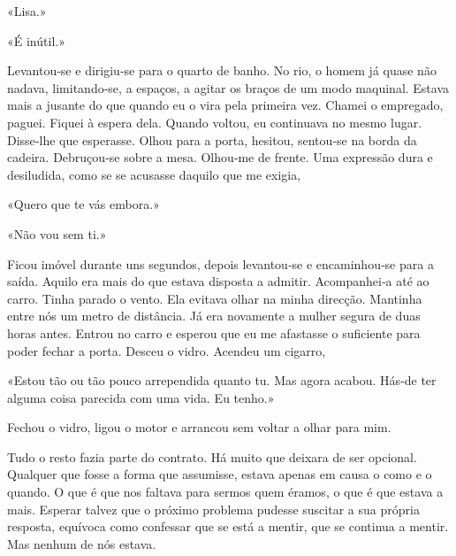 «Lisa.»

«É inútil.»

Levantou­‑se e dirigiu­‑se para o quarto de banho. No rio, o homem já
quase não nadava, limitando­‑se, a espaços, a agitar os braços de um
modo maquinal. Estava mais a jusante do que quando eu o vira pela
primeira vez. Chamei o empregado, paguei. Fiquei à espera dela. Quando
voltou, eu continuava no mesmo lugar. Disse­‑lhe que esperasse. Olhou
para a porta, hesitou, sentou­‑se na borda da cadeira. Debruçou­‑se
sobre a mesa. Olhou­‑me de frente. Uma expressão dura e desiludida, como
se se acusasse daquilo que me exigia,

«Quero que te vás embora.»

«Não vou sem ti.»

Ficou imóvel durante uns segundos, depois levantou­‑se e encaminhou­‑se
para a saída. Aquilo era mais do que estava disposta a admitir.
Acompanhei­‑a até ao carro. Tinha parado o vento. Ela evitava olhar na
minha direcção. Mantinha entre nós um metro de distância. Já era
novamente a mulher segura de duas horas antes. Entrou no carro e esperou
que eu me afastasse o suficiente para poder fechar a porta. Desceu o
vidro. Acendeu um cigarro,

«Estou tão ou tão pouco arrependida quanto tu. Mas agora acabou. Hás­‑de
ter alguma coisa parecida com uma vida. Eu tenho.»

Fechou o vidro, ligou o motor e arrancou sem voltar a olhar para mim.

Tudo o resto fazia parte do contrato. Há muito que deixara de ser
opcional. Qualquer que fosse a forma que assumisse, estava apenas em
causa o como e o quando. O que é que nos faltava para sermos quem
éramos, o que é que estava a mais. Esperar talvez que o próximo problema
pudesse suscitar a sua própria resposta, equívoca como confessar que se
está a mentir, que se continua a mentir. Mas nenhum de nós estava.

